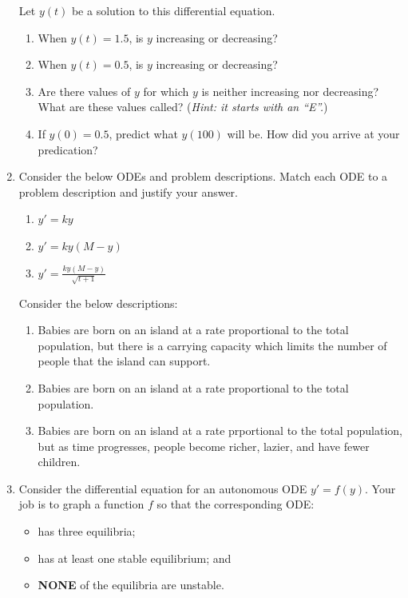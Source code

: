 \begin{enumerate}
    Let $y(t)$ be a solution to this differential equation.

    \begin{enumerate}
        \item When $y(t)=1.5$, is $y$ increasing or decreasing? 
        \item When $y(t)=0.5$, is $y$ increasing or decreasing?
        \item Are there values of $y$ for which $y$ is neither increasing nor decreasing? What are these values called? (\emph{Hint: it starts with an ``E''.})
        \item If $y(0)=0.5$, predict what $y(100)$ will be. How did you arrive at your predication?
    \end{enumerate}

    \item Consider the below ODEs and problem descriptions. Match each ODE to a problem description and justify your answer.
    \begin{tcolorbox}[sharp corners=all,colframe=tolGrey,colback=white]
        \begin{multicols}{2}
        \begin{enumerate}[label={(\roman{enumii})},nosep,itemsep=1mm]
            \item $y'=ky$
            \item $y'=ky(M-y)$
            \item $y'=\frac{ky(M-y)}{\sqrt{t+1}}$
        \end{enumerate}
        \end{multicols}
    \end{tcolorbox}

    Consider the below descriptions:
    \begin{enumerate}
        \item Babies are born on an island at a rate proportional to the total population, but there is a carrying capacity which limits the number of people that the island can support.
        \item Babies are born on an island at a rate proportional to the total population.
        \item Babies are born on an island at a rate prportional to the total population, but as time progresses, people become richer, lazier, and have fewer children.
    \end{enumerate}


    \item Consider the differential equation for an autonomous ODE $y'=f(y)$.
    Your job is to graph a function $f$ so that the corresponding ODE:
    \begin{itemize}[nosep]
        \item has three equilibria;
        \item has at least one stable equilibrium; and
        \item \textbf{NONE} of the equilibria are unstable.
    \end{itemize}


\end{enumerate}
